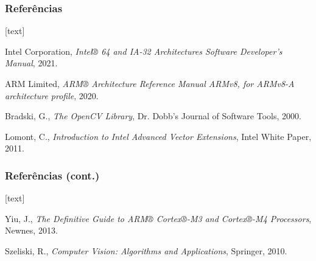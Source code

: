 \documentclass[11pt]{beamer}
\begin{document}
\begin{frame}
\frametitle{Referências}

\begin{thebibliography}{9}
[text]

Intel Corporation, 
\textit{Intel® 64 and IA-32 Architectures Software Developer's Manual}, 
2021.

ARM Limited, 
\textit{ARM® Architecture Reference Manual ARMv8, for ARMv8-A architecture profile}, 
2020.

Bradski, G., 
\textit{The OpenCV Library}, 
Dr. Dobb's Journal of Software Tools, 
2000.

Lomont, C., 
\textit{Introduction to Intel Advanced Vector Extensions}, 
Intel White Paper, 
2011.

\end{thebibliography}

\end{frame}

\begin{frame}
\frametitle{Referências (cont.)}

\begin{thebibliography}{9}
[text]

Yiu, J., 
\textit{The Definitive Guide to ARM® Cortex®-M3 and Cortex®-M4 Processors}, 
Newnes, 
2013.

Szeliski, R., 
\textit{Computer Vision: Algorithms and Applications}, 
Springer, 
2010.

\end{thebibliography}

\end{frame}
\end{document}
